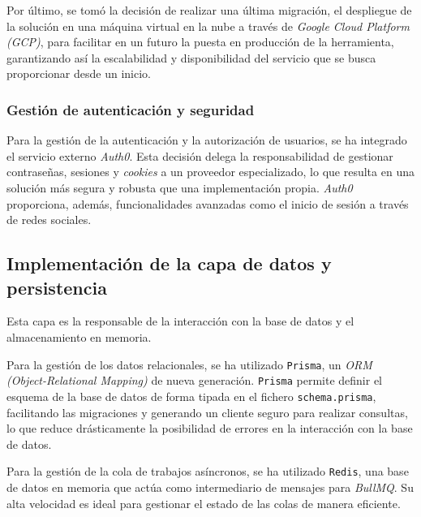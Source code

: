 Por último, se tomó la decisión de realizar una última migración, el despliegue de la solución en una máquina virtual en la nube a través de \textit{Google Cloud Platform (GCP)}, para facilitar en un futuro la puesta en producción de la herramienta, garantizando así la escalabilidad y disponibilidad del servicio que se busca proporcionar desde un inicio. 

\subsubsection{Gestión de autenticación y seguridad}
Para la gestión de la autenticación y la autorización de usuarios, se ha integrado el servicio externo \textit{Auth0}. Esta decisión delega la responsabilidad de gestionar contraseñas, sesiones y \textit{cookies} a un proveedor especializado, lo que resulta en una solución más segura y robusta que una implementación propia. \textit{Auth0} proporciona, además, funcionalidades avanzadas como el inicio de sesión a través de redes sociales.

\subsection{Implementación de la capa de datos y persistencia}
\label{subsec:desarrollo_datos}
Esta capa es la responsable de la interacción con la base de datos y el almacenamiento en memoria.

Para la gestión de los datos relacionales, se ha utilizado \texttt{Prisma}, un \textit{ORM (Object-Relational Mapping)} de nueva generación. \texttt{Prisma} permite definir el esquema de la base de datos de forma tipada en el fichero \texttt{schema.prisma}, facilitando las migraciones y generando un cliente seguro para realizar consultas, lo que reduce drásticamente la posibilidad de errores en la interacción con la base de datos.

Para la gestión de la cola de trabajos asíncronos, se ha utilizado \texttt{Redis}, una base de datos en memoria que actúa como intermediario de mensajes para \textit{BullMQ}. Su alta velocidad es ideal para gestionar el estado de las colas de manera eficiente.